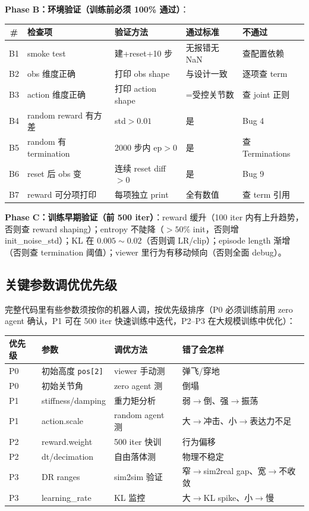 \textbf{Phase B：环境验证（训练前必须 100\% 通过）}：

\begin{center}
\small
\begin{tabular}{@{}cp{3.4cm}p{3.4cm}p{2.8cm}p{2.2cm}@{}}
\toprule
\# & 检查项 & 验证方法 & 通过标准 & 不通过 \\
\midrule
B1 & smoke test & 建+reset+10 步 & 无报错无 NaN & 查配置依赖 \\
B2 & obs 维度正确 & 打印 obs shape & 与设计一致 & 逐项查 term \\
B3 & action 维度正确 & 打印 action shape & =受控关节数 & 查 joint 正则 \\
B4 & random reward 有方差 & std$>0.01$ & 是 & Bug 4 \\
B5 & random 有 termination & 2000 步内 ep$>0$ & 是 & 查 Terminations \\
B6 & reset 后 obs 变 & 连续 reset diff$>0$ & 是 & Bug 9 \\
B7 & reward 可分项打印 & 每项独立 print & 全有数值 & 查 term 引用 \\
\bottomrule
\end{tabular}
\end{center}

\textbf{Phase C：训练早期验证（前 500 iter）}：reward 缓升（100 iter 内有上升趋势，否则查 reward shaping）；entropy 不陡降（$>50\%$ init，否则增 init\_noise\_std）；KL 在 $0.005\sim 0.02$（否则调 LR/clip）；episode length 渐增（否则查 termination 阈值）；viewer 里行为有移动倾向（否则全面 debug）。

\subsection{关键参数调优优先级}
\label{sec:rlmc-diy-tuning}

完整代码里有些参数须按你的机器人调，按优先级排序（P0 必须训练前用 zero agent 确认，P1 可在 500 iter 快速训练中迭代，P2--P3 在大规模训练中优化）：

\begin{center}
\small
\begin{tabular}{@{}llp{3.4cm}p{3.6cm}@{}}
\toprule
优先级 & 参数 & 调优方法 & 错了会怎样 \\
\midrule
P0 & 初始高度 \verb|pos[2]| & viewer 手动测 & 弹飞/穿地 \\
P0 & 初始关节角 & zero agent 测 & 倒塌 \\
P1 & stiffness/damping & 重力矩分析 & 弱$\to$倒、强$\to$振荡 \\
P1 & action.scale & random agent 测 & 大$\to$冲击、小$\to$表达力不足 \\
P2 & reward.weight & 500 iter 快训 & 行为偏移 \\
P2 & dt/decimation & 自由落体测 & 物理不稳定 \\
P3 & DR ranges & sim2sim 验证 & 窄$\to$sim2real gap、宽$\to$不收敛 \\
P3 & learning\_rate & KL 监控 & 大$\to$KL spike、小$\to$慢 \\
\bottomrule
\end{tabular}
\end{center}

